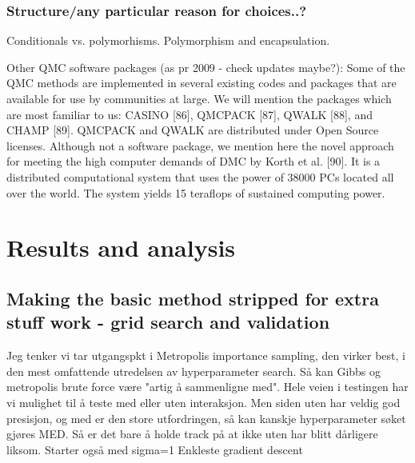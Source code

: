 \documentclass[twoside,english]{uiofysmaster}
\begin{document}
\section{Structure/any particular reason for choices..?}
Conditionals vs. polymorhisms. Polymorphism and encapsulation.

Other QMC software packages (as pr 2009 - check updates maybe?):
Some of the QMC methods are implemented in several existing codes and packages that are available for use by communities at large. We will mention the packages which are most familiar to us: CASINO [86], QMCPACK [87], QWALK [88], and CHAMP [89]. QMCPACK and QWALK are distributed under Open Source licenses.
Although not a software package, we mention here the novel approach for meeting the high computer demands of DMC by Korth et al. [90]. It is a distributed computational system that uses the power of  38000 PCs located all over the world. The system yields  15 teraflops of sustained computing power.
\cite{Lester2009}

\part{Results and analysis}
\chapter{Making the basic method stripped for extra stuff work - grid search and validation}
Jeg tenker vi tar utgangspkt i Metropolis importance sampling, den virker best, i den mest omfattende utredelsen av hyperparameter search. Så kan Gibbs og metropolis brute force være "artig å sammenligne med". Hele veien i testingen har vi mulighet til å teste med eller uten interaksjon. Men siden uten har veldig god presisjon, og med er den store utfordringen, så kan kanskje hyperparameter søket gjøres MED. Så er det bare å holde track på at ikke uten har blitt dårligere liksom.
Starter også med sigma=1
Enkleste gradient descent
\end{document}
